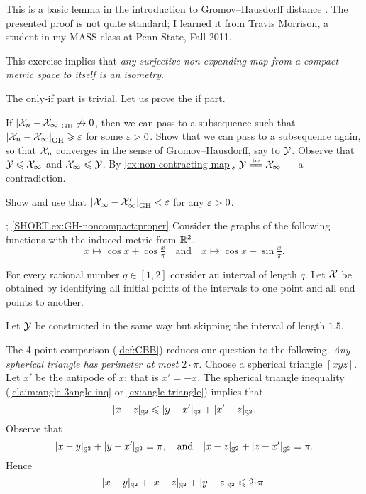 This is a basic lemma in the introduction to Gromov--Hausdorff distance \cite[see 7.3.30 in][]{burago-burago-ivanov}.
The presented proof is not quite standard;
I learned it from Travis Morrison, 
a student in my MASS class at Penn State, Fall 2011.

This exercise implies that \textit{any surjective non-expanding map from a compact metric space to itself is an isometry}.

The only-if part is trivial. 
Let us prove the if part.

If $|{\mathcal{X}_n}-{\mathcal{X}_\infty}|_{\operatorname{\rm GH}\nolimits}^{{}}\not\to 0$, then we can pass to a subsequence such that $|{\mathcal{X}_n}-{\mathcal{X}_\infty}|_{\operatorname{\rm GH}\nolimits}^{{}}\geqslant\varepsilon$ for some $\varepsilon>0$.
Show that we can pass to a subsequence again, so that $\mathcal{X}_n$ converges in the sense of Gromov--Hausdorff, say to $\mathcal{Y}$.
Observe that $\mathcal{Y}\leqslant \mathcal{X}_\infty$ and $\mathcal{X}_\infty\leqslant\mathcal{Y}$.
By \ref{ex:non-contracting-map}, $\spc{Y}\iso \spc{X}_\infty$ --- a contradiction.

 Show and use that $|{\mathcal{X}_\infty}-{\mathcal{X}_\infty'}|_{\operatorname{\rm GH}\nolimits}^{{}}<\varepsilon$ for any $\varepsilon>0$.



\parbf{\ref{ex:GH-noncompact}}; \ref{SHORT.ex:GH-noncompact:proper}
 Consider the graphs of the following functions with the induced metric from $\mathbb{R}^2$.
\[
x\mapsto \cos x+\cos \tfrac x\pi
\quad\text{and}\quad
x\mapsto \cos x+\sin \tfrac x\pi.
\]


\parit{\ref{SHORT.ex:GH-noncompact:bounded}}
For every rational number  $q\in[1,2]$ consider an interval of length $q$. Let $\mathcal{X}$ be obtained by identifying all  initial points of  the intervals to one point and all  end points to another.

Let $\mathcal{Y}$ be constructed in the same way but skipping the interval of length $1.5$.



The 4-point comparison (\ref{def:CBB}) reduces our question to the following.
\textit{Any spherical triangle has perimeter at most $2\cdot\pi$.}
Choose a spherical triangle $[xyz]$.
Let $x'$ be the antipode of $x$; that is $x'=-x$.
The spherical triangle inequality (\ref{claim:angle-3angle-inq} or \ref{ex:angle-triangle}) implies that
\[|{x}-{z}|_{\mathbb{S}^2}^{{}}\leqslant |{y}-{x'}|_{\mathbb{S}^2}^{{}}+|{x'}-{z}|_{\mathbb{S}^2}^{{}}.\]
Observe that 
\[
|{x}-{y}|_{\mathbb{S}^2}^{{}}+|{y}-{x'}|_{\mathbb{S}^2}^{{}}=\pi,
\quad\text{and}\quad
|{x}-{z}|_{\mathbb{S}^2}^{{}}+|{z}-{x'}|_{\mathbb{S}^2}^{{}}=\pi.
\]
Hence
\[\dist{x}{y}{\mathbb{S}^2}+\dist{x}{z}{\mathbb{S}^2}+\dist{y}{z}{\mathbb{S}^2}\le2\cdot \pi.\]

